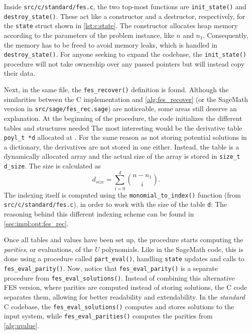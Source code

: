 Inside \texttt{src/c/standard/fes.c}, the two top-most functions are \texttt{init\_state()} and \texttt{destroy\_state()}. These act like a constructor and a destructor, respectively, for the \texttt{state} struct shown in \cref{lst:c:state}. The constructor allocates heap memory according to the parameters of the problem instance, like $n$ and $n_1$. Consequently, the memory has to be freed to avoid memory leaks, which is handled in \texttt{destroy\_state()}. For anyone seeking to expand the codebase, the \texttt{init\_state()} procedure will not take ownership over any passed pointers but will instead copy their data.

Next, in the same file, the \texttt{fes\_recover()} definition is found. Although the similarities between the C implementation and \cref{alg:fes_recover} (or the SageMath version in \texttt{src/sage/fes\_rec.sage}) are noticeable, some areas still deserve an explanation. At the beginning of the procedure, the code initializes the different tables and structures needed
The most interesting would be the derivative table \texttt{poyl\_t *d} allocated at . For the same reason as not storing potential solutions in a dictionary, the derivatives are not stored in one either. Instead, the table is a dynamically allocated array and the actual size of the array is stored in \texttt{size\_t d\_size}. The size is calculated as 
\begin{equation}
    d_{size} = \sum_{i = 0}^{d} \binom{n - n_1}{i}.
\end{equation}
The indexing itself is computed using the \texttt{monomial\_to\_index()} function (from \texttt{src/c/standard/fes.c}), in order to work with the size of the table \texttt{d}:
The reasoning behind this different indexing scheme can be found in \cref{sec:impl:opt:fes_rec}.

Once all tables and values have been set up, the procedure starts computing the \textit{parities}, or evaluations, of the $U$ polynomials. Like in the SageMath code, this is done using a procedure called \texttt{part\_eval()}, handling \texttt{state} updates and calls to \texttt{fes\_eval\_parity()}. Now, notice that \texttt{fes\_eval\_parity()} is a separate procedure from \texttt{fes\_eval\_solutions()}. Instead of combining this alternative FES version, where parities are computed instead of storing solutions, the C code separates them, allowing for better readability and extendability. In the \textit{standard} C codebase, the \texttt{fes\_eval\_solutions()} computes and stores solutions to the input system, while \texttt{fes\_eval\_parities()} computes the parities from \cref{alg:uvalue}.

